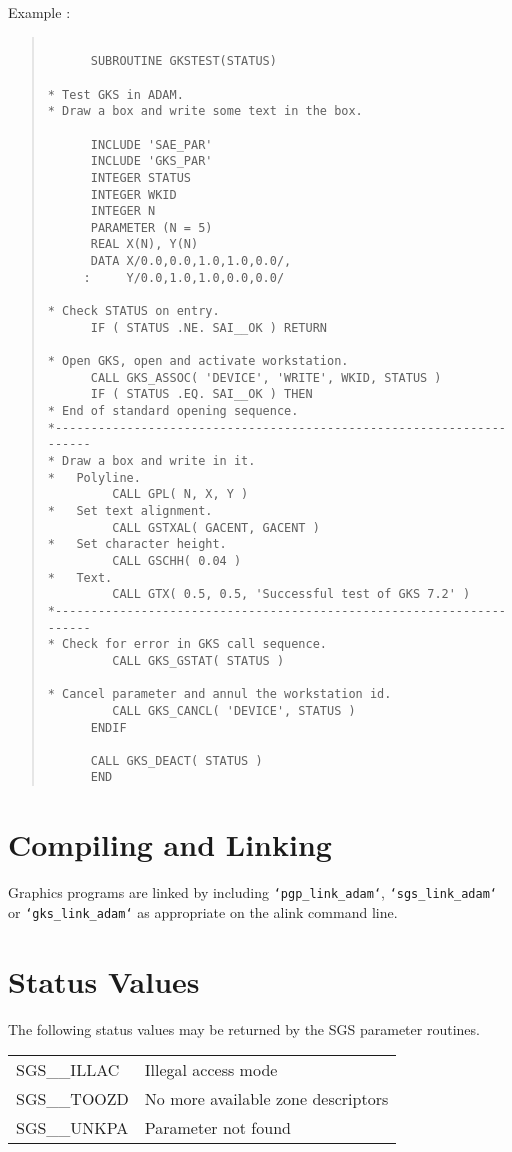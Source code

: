 Example :\nopagebreak
\begin{quote}
\begin{verbatim}

      SUBROUTINE GKSTEST(STATUS)

* Test GKS in ADAM.
* Draw a box and write some text in the box.

      INCLUDE 'SAE_PAR'
      INCLUDE 'GKS_PAR'
      INTEGER STATUS
      INTEGER WKID
      INTEGER N
      PARAMETER (N = 5)
      REAL X(N), Y(N)
      DATA X/0.0,0.0,1.0,1.0,0.0/,
     :     Y/0.0,1.0,1.0,0.0,0.0/

* Check STATUS on entry.
      IF ( STATUS .NE. SAI__OK ) RETURN

* Open GKS, open and activate workstation.
      CALL GKS_ASSOC( 'DEVICE', 'WRITE', WKID, STATUS )
      IF ( STATUS .EQ. SAI__OK ) THEN
* End of standard opening sequence.
*---------------------------------------------------------------------
* Draw a box and write in it.
*   Polyline.
         CALL GPL( N, X, Y )
*   Set text alignment.
         CALL GSTXAL( GACENT, GACENT )
*   Set character height.
         CALL GSCHH( 0.04 )
*   Text.
         CALL GTX( 0.5, 0.5, 'Successful test of GKS 7.2' )
*---------------------------------------------------------------------
* Check for error in GKS call sequence.
         CALL GKS_GSTAT( STATUS )

* Cancel parameter and annul the workstation id.
         CALL GKS_CANCL( 'DEVICE', STATUS )
      ENDIF

      CALL GKS_DEACT( STATUS )
      END
\end{verbatim}
\end{quote}


\section{Compiling and Linking}

Graphics programs are linked by including {\tt `pgp\_link\_adam`}, 
{\tt `sgs\_link\_adam`} or {\tt `gks\_link\_adam`} as appropriate on
the alink command line.

\section{Status Values}
\label{errs}
The following status values may be returned by the SGS parameter
routines.

\begin{tabular}{ll}
SGS\_\_ILLAC     & Illegal access mode \\
SGS\_\_TOOZD     & No more available zone descriptors \\
SGS\_\_UNKPA     & Parameter not found \\
\end{tabular}


